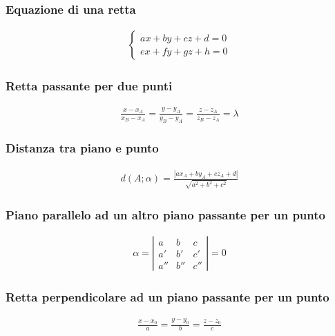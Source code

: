 \documentclass[a4paper]{article}
\begin{document}
	\subsubsection{Equazione di una retta}
	\begin{align*}
		\begin{cases}
		ax+by+cz+d=0\\
		ex+fy+gz+h=0
		\end{cases}
	\end{align*}

	\subsubsection{Retta passante per due punti}
	\begin{align*}
		\frac{x - x_A}{x_B - x_A} = \frac{y - y_A}{y_B - y_A} = \frac{z - z_A}{z_B - z_A} = \lambda
	\end{align*}

	\subsubsection{Distanza tra piano e punto}
	\begin{align*}
		d(A ; \alpha) = \frac{|ax_A + by_A + cz_A + d|}{\sqrt{a^2+b^2+c^2}}
	\end{align*}
	
	\subsubsection{Piano parallelo ad un altro piano passante per un punto}
	
	\begin{align*}
	\alpha = \left|
		\begin{array}{ccc}
			a & b & c \\ 
			a' & b' & c' \\ 
			a'' & b'' & c''
		\end{array}
		\right| = 0 
	\end{align*}
		
	\subsubsection{Retta perpendicolare ad un piano passante per un punto}
	
	\begin{align*}
		\frac{x-x_0}{a} = \frac{y-y_0}{b} = \frac{z-z_0}{c}
	\end{align*}
	
\end{document}

